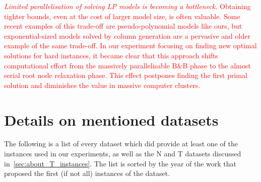 \documentclass[ppgc,tese,english,formais,babel]{iiufrgs}
\newif\iffinalversion
\newcommand{\oldtext}[1]{\iffinalversion%
\else%
\textcolor{red}{#1}%
\fi%
}
\begin{document}
\oldtext{
\emph{Limited parallelisation of solving LP models is becoming a bottleneck.}
Obtaining tighter bounds, even at the cost of larger model size, is often valuable.
Some recent examples of this trade-off are pseudo-polynomial models like ours, but exponential-sized models solved by column generation are a pervasive and older example of the same trade-off.
In our experiment focusing on finding new optimal solutions for hard instances, it became clear that this approach shifts computational effort from the massively parallelisable B\&B phase to the almost serial root node relaxation phase.
This effect postpones finding the first primal solution and diminishes the value in massive computer clusters.
}



%




\appendix

\chapter{Details on mentioned datasets}
\label{sec:datasets}

The following is a list of every dataset which did provide at least one of the instances used in our experiments, as well as the N and T datasets discussed in~\cref{sec:about_T_instances}.
The list is sorted by the year of the work that proposed the first (if not all) instances of the dataset.

\end{document}
